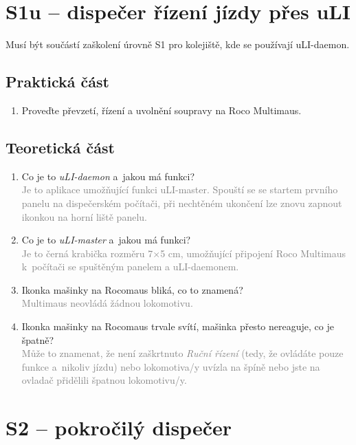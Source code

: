 \documentclass[12pt,a4paper]{article}
\newcommand{\solution}[1]{\\ \textcolor{gray}{#1}}
\newcommand{\solution}[1]{}
\begin{document}
\newpage
\section{S1u – dispečer řízení jízdy přes uLI}

Musí být součástí zaškolení úrovně S1 pro kolejiště, kde se používají
uLI-daemon.

\subsection{Praktická část}

\begin{enumerate}[leftmargin=*]
\item Proveďte převzetí, řízení a uvolnění soupravy na Roco Multimaus.
\end{enumerate}

\subsection{Teoretická část}

\begin{enumerate}[leftmargin=*]

\item Co je to \textit{uLI-daemon} a~jakou má funkci?
\solution{Je to aplikace umožňující funkci uLI-master. Spouští se se startem
prvního panelu na dispečerském počítači, při nechtěném ukončení lze znovu
zapnout ikonkou na horní liště panelu.}

\item Co je to \textit{uLI-master} a~jakou má funkci?
\solution{Je to černá krabička rozměru 7×5 cm, umožňující připojení Roco
Multimaus k~počítači se spuštěným panelem a uLI-daemonem.}

\item Ikonka mašinky na Rocomaus bliká, co to znamená?
\solution{Multimaus neovládá žádnou lokomotivu.}

\item Ikonka mašinky na Rocomaus trvale svítí, mašinka přesto nereaguje,
co je špatně?
\solution{Může to znamenat, že není zaškrtnuto \textit{Ruční řízení} (tedy, že
ovládáte pouze funkce a~nikoliv jízdu) nebo lokomotiva/y uvízla na špíně nebo
jste na ovladač přidělili špatnou lokomotivu/y.}

\end{enumerate}


\newpage
\section{S2 – pokročilý dispečer}
\end{document}
